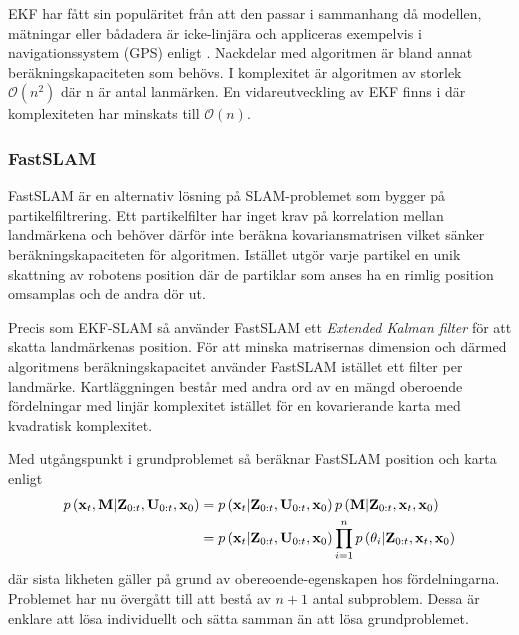 \documentclass[11pt]{article}
\newcommand{\bfr}[1]{\textbf{\textrm{{#1}}}}
\begin{document}
\begin{flushleft}
EKF har fått sin populäritet från att den passar i sammanhang då modellen, mätningar eller bådadera är icke-linjära och appliceras exempelvis i navigationssystem (GPS) enligt \cite{ekfINaction}. Nackdelar med algoritmen är bland annat beräkningskapaciteten som behövs. I komplexitet är algoritmen av storlek $\mathcal{O}\left(n^{2}\right)$ där n är antal lanmärken. En vidareutveckling av EKF finns i \cite{ordo} där komplexiteten har minskats till $\mathcal{O}\left(n\right)$.

\subsubsection{FastSLAM}
FastSLAM är en alternativ lösning på SLAM-problemet som bygger på partikelfiltrering. Ett partikelfilter har inget krav på korrelation mellan landmärkena och behöver därför inte beräkna kovariansmatrisen vilket sänker beräkningskapaciteten för algoritmen. Istället utgör varje partikel en unik skattning av robotens position där de partiklar som anses ha en rimlig position omsamplas och de andra dör ut.

Precis som EKF-SLAM så använder FastSLAM ett \emph{Extended Kalman filter} för att skatta landmärkenas position. För att minska matrisernas dimension och därmed algoritmens beräkningskapacitet använder FastSLAM istället ett filter per landmärke. Kartläggningen består med andra ord av en mängd oberoende fördelningar med linjär komplexitet istället för en kovarierande karta med kvadratisk komplexitet.

Med utgångspunkt i grundproblemet så beräknar FastSLAM position och karta enligt
\begin{align*}
	p\left(\textbf{\textrm{x}}_{t},\textbf{\textrm{M}} \vert \textbf{\textrm{Z}}_{0:t}, \textbf{\textrm{U}}_{0:t}, \textbf{\textrm{x}}_0 \right) &= p\left(\textbf{\textrm{x}}_{t}\vert \textbf{\textrm{Z}}_{0:t}, \textbf{\textrm{U}}_{0:t}, \textbf{\textrm{x}}_0 \right)p\left(\textbf{\textrm{M}} \vert \textbf{\textrm{Z}}_{0:t}, \bfr{x}_{t}, \textbf{\textrm{x}}_0 \right) \\
	&= p\left(\textbf{\textrm{x}}_{t}\vert \textbf{\textrm{Z}}_{0:t}, \textbf{\textrm{U}}_{0:t}, \textbf{\textrm{x}}_0 \right)\prod_{i=1}^{n} p\left(\theta_{i} \vert \textbf{\textrm{Z}}_{0:t}, \bfr{x}_{t}, \textbf{\textrm{x}}_0 \right)
\end{align*}
där sista likheten gäller på grund av obereoende-egenskapen hos fördelningarna. Problemet har nu övergått till att bestå av $n + 1$ antal subproblem. Dessa är enklare att lösa individuellt och sätta samman än att lösa grundproblemet.


\end{flushleft}
\end{document}
